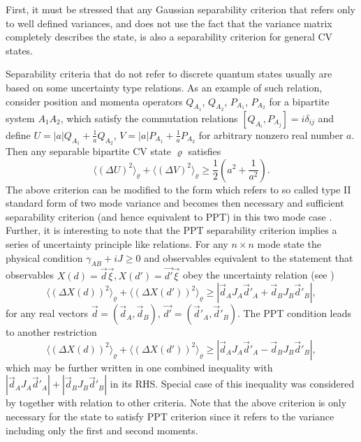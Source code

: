 \documentclass[rmp,12pt,preprint]{revtex4-2}
\begin{document}
First, it must be stressed that any Gaussian separability criterion
that refers only to well defined variances, and does not use the fact
that the variance matrix completely describes the state, is also a
separability criterion for general CV states.

Separability criteria that do not refer to discrete quantum states
usually are based on some uncertainty type relations. As an example
of such relation, consider position and momenta operators
$Q_{A_{1}}$, $Q_{A_{2}}$, $P_{A_{1}}$, $P_{A_{2}}$ for a bipartite
system $A_{1}A_{2}$, which satisfy the commutation relations
$[Q_{A_{i}},P_{A_{j}}]=i\delta_{ij}$ and define
$U=|a|Q_{A_{1}}+\frac{1}{a}Q_{A_{2}}$,
$V=|a|P_{A_{1}}+\frac{1}{a}P_{A_{2}}$ for arbitrary nonzero real
number $a$. Then any separable bipartite CV state $\varrho$
satisfies \cite{DuanGCZ1999-criterion}
\begin{equation}
\langle (\Delta U)^{2} \rangle_{\varrho} + \langle (\Delta V)^{2} \rangle_{\varrho}
\geq \frac{1}{2}(a^{2} + \frac{1}{a^{2}}).
\end{equation}
The above criterion can be modified to the form which refers to so
called type II standard form of two mode variance and becomes then
necessary and sufficient separability criterion (and hence equivalent
to PPT) in this two mode case \cite{DuanGCZ1999-criterion}. Further,
it is interesting to note that the PPT separability criterion implies
a series of uncertainty principle like relations. For any $n\times n$
mode state the physical condition $\gamma_{AB} + iJ\geq 0$ and
observables equivalent to the statement that observables
$X(d)=\vec{d}\vec{\xi}$,\,$X(d')=\vec{d'}\vec{\xi}$ obey the
uncertainty relation (see \cite{Simon1})
\begin{equation}
\langle (\Delta X(d))^{2} \rangle_{\varrho} + \langle (\Delta X(d'))^{2} \rangle_{\varrho}
\geq |\vec{d}_{A}J_{A}\vec{d}'_{A} + \vec{d}_{B}J_{B}\vec{d}'_{B}|,
\end{equation}
for any real vectors $\vec{d}=(\vec{d}_{A},\vec{d}_{B})$,
$\vec{d'}=(\vec{d}'_{A},\vec{d}'_{B})$.
The PPT condition leads to another restriction \cite{Simon1}
\begin{equation}
\langle (\Delta X(d))^{2} \rangle_{\varrho} + \langle (\Delta X(d'))^{2} \rangle_{\varrho}
\geq |\vec{d}_{A}J_{A}\vec{d}'_{A} - \vec{d}_{B}J_{B}\vec{d}'_{B}|,
\end{equation}
which may be further  written in one combined inequality with
$|\vec{d}_{A}J_{A}\vec{d}'_{A}| +|\vec{d}_{B}J_{B}\vec{d}'_{B}|$ in
its RHS. Special case of this inequality was considered by
\cite{Giovannetti1} together with relation to other criteria.
Note that the above criterion is only necessary for the state to
satisfy PPT criterion since it refers to the variance including only the first
and second moments.
\end{document}
